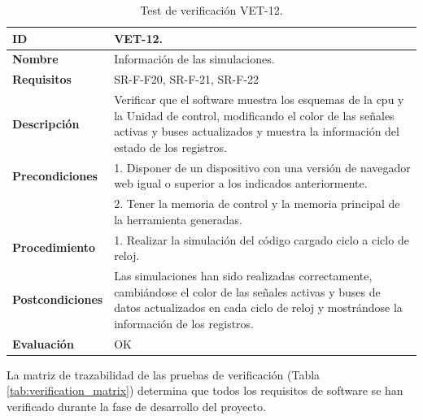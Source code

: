 \begin{center}
\begin{table}[htbp]
\centering
\caption{Test de verificación VET-12.}
\begin{tabular}{@{}p{2.5cm} p{13cm}@{}} 
\toprule
\textbf{ID} 					& VET-12. \\
\midrule
\textbf{Nombre} 				& Información de las simulaciones. \\
\midrule
\textbf{Requisitos} 		& SR-F-F20, SR-F-21, SR-F-22\\
\midrule
\textbf{Descripción} 		& Verificar que el \gls{software} muestra los esquemas de la \acrshort{cpu} y la Unidad de control, modificando el color de las señales activas y buses actualizados y muestra la información del estado de los registros. \\
\midrule
\textbf{Precondiciones}		& 1. Disponer de un dispositivo con una versión de navegador web igual o superior a los indicados anteriormente. \\
											& 2. Tener la memoria de control y la memoria principal de la herramienta generadas. \\
\midrule
\textbf{Procedimiento}		& 1. Realizar la simulación del código cargado ciclo a ciclo de reloj.\\
\midrule
\textbf{Postcondiciones} 		&  Las simulaciones han sido realizadas correctamente, cambiándose el color de las señales activas y buses de datos actualizados en cada ciclo de reloj y mostrándose la información de los registros.\\
\midrule
\textbf{Evaluación} 			& OK \\
\bottomrule
\end{tabular}
\label{tab:vet12}
\end{table}
\end{center}

\clearpage

La matriz de trazabilidad de las pruebas de verificación (Tabla \ref{tab:verification_matrix}) determina que todos los requisitos de \gls{software} se han verificado durante la fase de desarrollo del proyecto.

\vspace{1cm}


